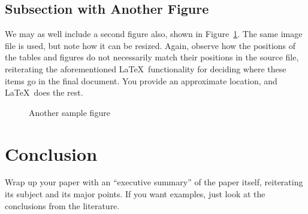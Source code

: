 \documentclass{article}
\begin{document}
\subsection{Subsection with Another Figure}

We may as well include a second figure also, shown in Figure~\ref{figure-sample2}.  The same image file is used, but note how it can be resized.  Again, observe how the positions of the tables and figures do not necessarily match their positions in the source file, reiterating the aforementioned \LaTeX\ functionality for deciding where these items go in the final document.  You provide an approximate location, and \LaTeX\ does the rest.

\begin{figure}
\centering


\caption{Another sample figure}
\label{figure-sample2}
\end{figure}

\section{Conclusion}

Wrap up your paper with an ``executive summary'' of the paper itself, reiterating its subject and its major points.  If you want examples, just look at the conclusions from the literature.



\end{document}
